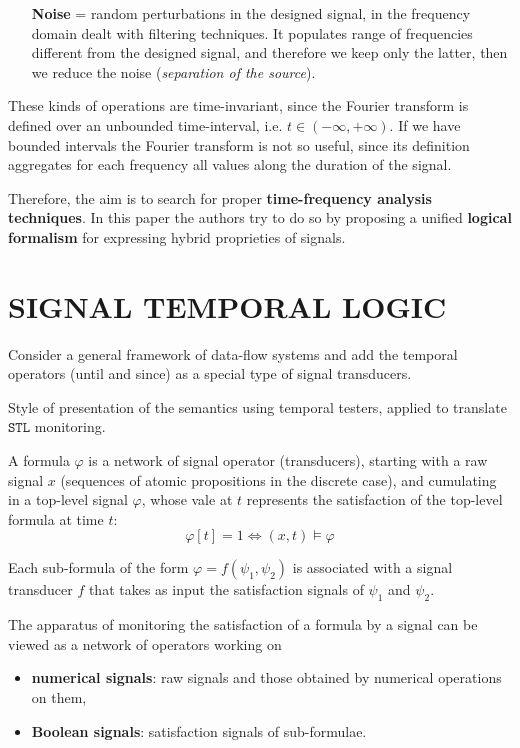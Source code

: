 \documentclass{suftesi}
\renewcommand{\b}{\textbf}
\renewcommand{\i}{\textit}
\newcommand{\STL}{$\mathtt{STL}$ }
\begin{document}
\begin{itemize} [leftmargin=1.3cm]
    \item [\b{Noise} =] random perturbations in the designed signal, in the frequency domain dealt with filtering techniques.
    It populates range of frequencies different from the designed signal, and therefore we keep only the latter, then we reduce the noise (\i{separation of the source}).
\end{itemize}

These kinds of operations are time-invariant, since the Fourier transform is defined over an unbounded time-interval, i.e. $t\in(-\infty,+\infty)$.
If we have bounded intervals the Fourier transform is not so useful, since its definition aggregates for each frequency all values along the duration of the signal.

Therefore, the aim is to search for proper \b{time-frequency analysis techniques}. In this paper the authors try to do so by proposing a unified \b{logical formalism} for expressing hybrid proprieties of signals.

\section{SIGNAL TEMPORAL LOGIC}

Consider a general framework of data-flow systems and add the temporal operators (until and since) as a special type of signal transducers.

Style of presentation of the semantics using temporal testers, applied to translate \STL monitoring.

A formula $\varphi$ is a network of signal operator (transducers), starting with a raw signal $x$ (sequences of atomic propositions in the discrete case), and cumulating in a top-level signal $\varphi$, whose vale at $t$ represents the satisfaction of the top-level formula at time $t$:
$$\varphi[t]=1 \Leftrightarrow (x,t)\vDash \varphi$$

Each sub-formula of the form $\varphi=f(\psi_1, \psi_2)$ is associated with a signal transducer $f$ that takes as input the satisfaction signals of $\psi_1$ and $\psi_2$.

The apparatus of monitoring the satisfaction of a formula by a signal can be viewed as a network of operators working on 
\begin{itemize}[leftmargin=0.5cm]
    \item \b{numerical signals}: raw signals and those obtained by numerical operations on them,
    \item \b{Boolean signals}: satisfaction signals of sub-formulae.
\end{itemize}
\end{document}
